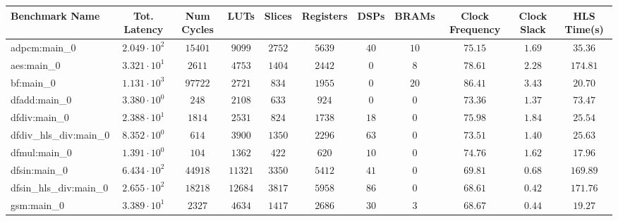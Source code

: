 \begin{tabular}{|l|c|c|c|c|c|c|c|c|c|c|}
\hline
Benchmark Name          & Tot. Latency           & Num Cycles & LUTs      & Slices    & Registers & DSPs    & BRAMs   & Clock Frequency & Clock Slack & HLS Time(s) \\
\hline
adpcm:main\_0           & $ 2.049 \cdot 10^{2} $ & $ 15401  $ & $ 9099  $ & $ 2752  $ & $ 5639  $ & $ 40  $ & $ 10  $ & $ 75.15       $ & $ 1.69    $ & $ 35.36   $ \\
aes:main\_0             & $ 3.321 \cdot 10^{1} $ & $ 2611   $ & $ 4753  $ & $ 1404  $ & $ 2442  $ & $ 0   $ & $ 8   $ & $ 78.61       $ & $ 2.28    $ & $ 174.81  $ \\
bf:main\_0              & $ 1.131 \cdot 10^{3} $ & $ 97722  $ & $ 2721  $ & $ 834   $ & $ 1955  $ & $ 0   $ & $ 20  $ & $ 86.41       $ & $ 3.43    $ & $ 20.70   $ \\
dfadd:main\_0           & $ 3.380 \cdot 10^{0} $ & $ 248    $ & $ 2108  $ & $ 633   $ & $ 924   $ & $ 0   $ & $ 0   $ & $ 73.36       $ & $ 1.37    $ & $ 73.47   $ \\
dfdiv:main\_0           & $ 2.388 \cdot 10^{1} $ & $ 1814   $ & $ 2531  $ & $ 824   $ & $ 1738  $ & $ 18  $ & $ 0   $ & $ 75.98       $ & $ 1.84    $ & $ 25.54   $ \\
dfdiv\_hls\_div:main\_0 & $ 8.352 \cdot 10^{0} $ & $ 614    $ & $ 3900  $ & $ 1350  $ & $ 2296  $ & $ 63  $ & $ 0   $ & $ 73.51       $ & $ 1.40    $ & $ 25.63   $ \\
dfmul:main\_0           & $ 1.391 \cdot 10^{0} $ & $ 104    $ & $ 1362  $ & $ 422   $ & $ 620   $ & $ 10  $ & $ 0   $ & $ 74.76       $ & $ 1.62    $ & $ 17.96   $ \\
dfsin:main\_0           & $ 6.434 \cdot 10^{2} $ & $ 44918  $ & $ 11321 $ & $ 3350  $ & $ 5412  $ & $ 41  $ & $ 0   $ & $ 69.81       $ & $ 0.68    $ & $ 169.89  $ \\
dfsin\_hls\_div:main\_0 & $ 2.655 \cdot 10^{2} $ & $ 18218  $ & $ 12684 $ & $ 3817  $ & $ 5958  $ & $ 86  $ & $ 0   $ & $ 68.61       $ & $ 0.42    $ & $ 171.76  $ \\
gsm:main\_0             & $ 3.389 \cdot 10^{1} $ & $ 2327   $ & $ 4634  $ & $ 1417  $ & $ 2686  $ & $ 30  $ & $ 3   $ & $ 68.67       $ & $ 0.44    $ & $ 19.27   $ \\

\end{tabular}
